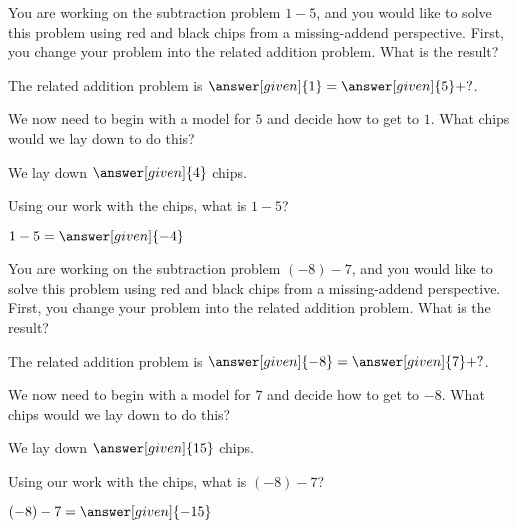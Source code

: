 \documentclass[nooutcomes]{ximera}
\begin{document}
\begin{question}
You are working on the subtraction problem $1-5$, and you would like to solve this problem using red and black chips from a missing-addend perspective.  First, you change your problem into the related addition problem.  What is the result?

\begin{prompt}
The related addition problem is $\answer[given]{1} = \answer[given]{5} + ?$.
\end{prompt}
\begin{question}
 We now need to begin with a model for $5$ and decide how to get to $1$.  What chips would we lay down to do this?

\begin{prompt}
	We lay down $\answer[given]{4}$  chips.
\end{prompt}
\begin{question}
 Using our work with the chips, what is $1-5$?
 
 \begin{prompt}
 	$1-5 = \answer[given]{-4}$
 \end{prompt}
\end{question}
\end{question}
\end{question}




\begin{question}
You are working on the subtraction problem $(-8)-7$, and you would like to solve this problem using red and black chips from a missing-addend perspective.  First, you change your problem into the related addition problem.  What is the result?

\begin{prompt}
The related addition problem is $\answer[given]{-8} = \answer[given]{7} + ?$.
\end{prompt}
\begin{question}
 We now need to begin with a model for $7$ and decide how to get to $-8$.  What chips would we lay down to do this?

\begin{prompt}
	We lay down $\answer[given]{15}$  chips.
\end{prompt}
\begin{question}
 Using our work with the chips, what is $(-8)-7$?
 
 \begin{prompt}
 	$(-8)-7 = \answer[given]{-15}$
 \end{prompt}
\end{question}
\end{question}
\end{question}
\end{document}
